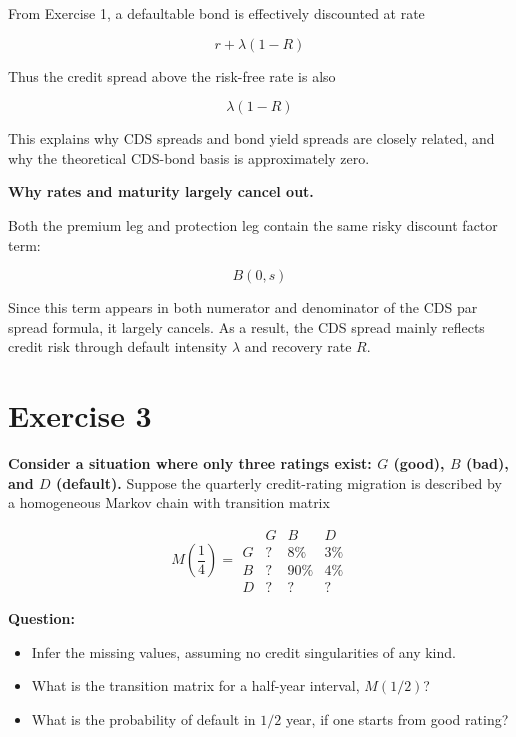 \documentclass{article}
\begin{document}
From Exercise 1, a defaultable bond is effectively discounted at rate

\[
r+\lambda(1-R)
\]

Thus the credit spread above the risk-free rate is also

\[
\lambda(1-R)
\]

This explains why CDS spreads and bond yield spreads are closely related, and why the theoretical CDS-bond basis is approximately zero.

\textbf{Why rates and maturity largely cancel out.}

Both the premium leg and protection leg contain the same risky discount factor term:

\[
B(0,s)
\]

Since this term appears in both numerator and denominator of the CDS par spread formula, it largely cancels. As a result, the CDS spread mainly reflects credit risk through default intensity $\lambda$ and recovery rate $R$.

\newpage


\section{Exercise 3}

\textbf{Consider a situation where only three ratings exist: $G$ (good), $B$ (bad), and $D$ (default).} Suppose the quarterly credit-rating migration is described by a homogeneous Markov chain with transition matrix

\[
M\left(\frac14\right)
=
\begin{array}{c|ccc}
 & G & B & D \\
\hline
G & ? & 8\% & 3\% \\
B & ? & 90\% & 4\% \\
D & ? & ? & ?
\end{array}
\]

\textbf{Question:}
\begin{itemize}
    \item[(a)] Infer the missing values, assuming no credit singularities of any kind.
    \item[(b)] What is the transition matrix for a half-year interval, $M(1/2)$?
    \item[(c)] What is the probability of default in $1/2$ year, if one starts from good rating?
\end{itemize}
\end{document}
